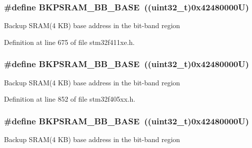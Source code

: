 \subsubsection[{\texorpdfstring{B\+K\+P\+S\+R\+A\+M\+\_\+\+B\+B\+\_\+\+B\+A\+SE}{BKPSRAM_BB_BASE}}]{\setlength{\rightskip}{0pt plus 5cm}\#define B\+K\+P\+S\+R\+A\+M\+\_\+\+B\+B\+\_\+\+B\+A\+SE~((uint32\+\_\+t)0x42480000\+U)}\hypertarget{group___peripheral__registers__structures_gaee19a30c9fa326bb10b547e4eaf4e250}{}\label{group___peripheral__registers__structures_gaee19a30c9fa326bb10b547e4eaf4e250}
Backup S\+R\+A\+M(4 K\+B) base address in the bit-\/band region 

Definition at line 675 of file stm32f411xe.\+h.

\subsubsection[{\texorpdfstring{B\+K\+P\+S\+R\+A\+M\+\_\+\+B\+B\+\_\+\+B\+A\+SE}{BKPSRAM_BB_BASE}}]{\setlength{\rightskip}{0pt plus 5cm}\#define B\+K\+P\+S\+R\+A\+M\+\_\+\+B\+B\+\_\+\+B\+A\+SE~((uint32\+\_\+t)0x42480000\+U)}\hypertarget{group___peripheral__registers__structures_gaee19a30c9fa326bb10b547e4eaf4e250}{}\label{group___peripheral__registers__structures_gaee19a30c9fa326bb10b547e4eaf4e250}
Backup S\+R\+A\+M(4 K\+B) base address in the bit-\/band region 

Definition at line 852 of file stm32f405xx.\+h.

\subsubsection[{\texorpdfstring{B\+K\+P\+S\+R\+A\+M\+\_\+\+B\+B\+\_\+\+B\+A\+SE}{BKPSRAM_BB_BASE}}]{\setlength{\rightskip}{0pt plus 5cm}\#define B\+K\+P\+S\+R\+A\+M\+\_\+\+B\+B\+\_\+\+B\+A\+SE~((uint32\+\_\+t)0x42480000\+U)}\hypertarget{group___peripheral__registers__structures_gaee19a30c9fa326bb10b547e4eaf4e250}{}\label{group___peripheral__registers__structures_gaee19a30c9fa326bb10b547e4eaf4e250}
Backup S\+R\+A\+M(4 K\+B) base address in the bit-\/band region 

